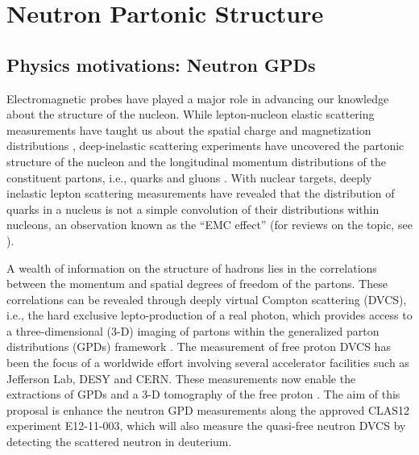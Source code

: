 \chapter{Neutron Partonic Structure}
\label{chap:physics}

\section{Physics motivations: Neutron GPDs}

Electromagnetic probes have played a major role in advancing our knowledge 
about the structure of the nucleon. While lepton-nucleon elastic scattering 
measurements have taught us about the spatial charge and magnetization 
distributions \cite{PhysRev.98.217,Perdrisat:2006hj}, deep-inelastic scattering experiments 
have uncovered the partonic structure of the nucleon and the longitudinal 
momentum distributions of the constituent partons, i.e., quarks and gluons 
\cite{PhysRevD.98.030001}.  With nuclear targets, deeply inelastic lepton scattering measurements 
have revealed that the distribution of quarks in a nucleus is not a simple 
convolution of their distributions within nucleons, an observation known as the 
``EMC effect''\cite{Aubert:1981gw} (for reviews on the topic, see  
\cite{ARNEODO1994301,Geesaman:1995yd,Norton:2003cb,RevModPhys.89.045002}).

A wealth of information on the structure of hadrons lies in the correlations 
between the momentum and spatial degrees of freedom of the partons. These 
correlations can be revealed through deeply virtual Compton scattering (DVCS), 
i.e., the hard exclusive lepto-production of a real photon, which provides 
access to a three-dimensional (3-D) imaging of partons within the generalized 
parton distributions (GPDs) framework 
\cite{Mueller:1998fv,PhysRevLett.78.610,PhysRevD.55.7114,Radyushkin:1996nd,PhysRevD.56.5524}.   
The measurement of free proton DVCS has been the focus of a worldwide effort 
\cite{PhysRevLett.87.182002,
   PhysRevLett.87.182001,
   PhysRevD.75.011103,
   Girod:2007aa,
   PhysRevC.92.055202,
   PhysRevLett.99.242501,
   PhysRevC.80.035206,
   PhysRevLett.114.032001,
   Jo:2015ema}
involving several accelerator facilities such as Jefferson Lab, DESY and  
CERN. These measurements now enable the extractions of GPDs and a 3-D 
tomography of the free proton \cite{Guidal:2013rya, PhysRevD.95.011501}. The 
aim of this proposal is enhance the neutron GPD measurements along the approved 
CLAS12 experiment E12-11-003, which will also measure the quasi-free neutron 
DVCS by detecting the scattered neutron in deuterium.  

